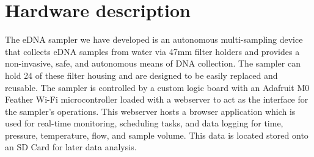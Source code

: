 \documentclass[11pt, letterpaper]{article}
\begin{document}
\section{Hardware description}




The eDNA sampler we have developed is an autonomous multi-sampling device that collects eDNA samples from water via 47mm filter holders and provides a non-invasive, safe, and autonomous means of DNA collection. The sampler can hold 24 of these filter housing and are designed to be easily replaced and reusable. The sampler is controlled by a custom logic board with an Adafruit M0 Feather Wi-Fi microcontroller loaded with a webserver to act as the interface for the sampler’s operations. This webserver hosts a browser application which is used for real-time monitoring, scheduling tasks, and data logging for time, pressure, temperature, flow, and sample volume. This data is located stored onto an SD Card for later data analysis. 
\end{document}
